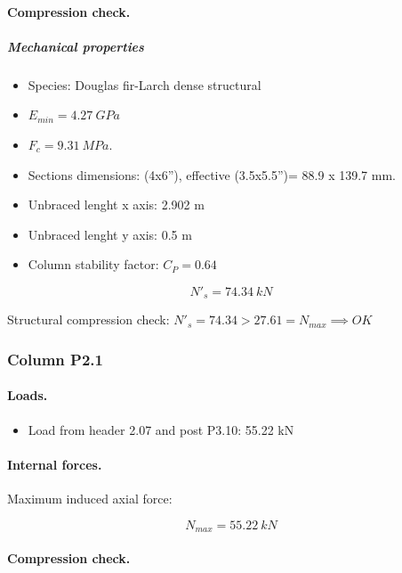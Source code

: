 \paragraph{Compression check.}

\subparagraph{Mechanical properties}

\begin{itemize}
\item Species: Douglas fir-Larch dense structural
\item $E_{min}= 4.27\ GPa$
\item $F_c= 9.31\ MPa$.
\item Sections dimensions: (4x6''), effective (3.5x5.5'')= 88.9 x 139.7  mm.
\item Unbraced lenght x axis: 2.902 m
\item Unbraced lenght y axis: 0.5 m
\item Column stability factor: $C_P= 0.64$
\end{itemize}

\begin{equation}
  N'_s= 74.34\ kN
\end{equation}

\noindent Structural compression check: $N'_s = 74.34 > 27.61 = N_{max} \implies OK$

\subsubsection{Column P2.1}

\paragraph{Loads.}

\begin{itemize}
\item Load from header 2.07 and post P3.10: 55.22 kN
\end{itemize}

\paragraph{Internal forces.}

\noindent Maximum induced axial force:

\begin{equation}
  N_{max}= 55.22\ kN
\end{equation}

\paragraph{Compression check.}

